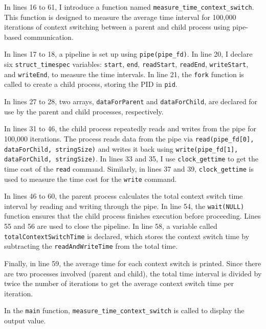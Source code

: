 \documentclass[10pt, answers]{exam}
\begin{document}
\begin{questions}
\begin{solution}
In lines 16 to 61, I introduce a function named \texttt{measure\_time\_context\_switch}. This function is designed to measure the average time interval for 100,000 iterations of context switching between a parent and child process using pipe-based communication.

In lines 17 to 18, a pipeline is set up using \texttt{pipe(pipe\_fd)}. In line 20, I declare six \texttt{struct\_timespec} variables: \texttt{start}, \texttt{end}, \texttt{readStart}, \texttt{readEnd}, \texttt{writeStart}, and \texttt{writeEnd}, to measure the time intervals. In line 21, the \texttt{fork\(\)} function is called to create a child process, storing the PID in \texttt{pid}.

In lines 27 to 28, two arrays, \texttt{dataForParent} and \texttt{dataForChild}, are declared for use by the parent and child processes, respectively.

In lines 31 to 46, the child process repeatedly reads and writes from the pipe for 100,000 iterations. The process reads data from the pipe via \texttt{read(pipe\_fd[0], dataForChild, stringSize)} and writes it back using \texttt{write(pipe\_fd[1], dataForChild, stringSize)}. In lines 33 and 35, I use \texttt{clock\_gettime} to get the time cost of the \texttt{read} command. Similarly, in lines 37 and 39, \texttt{clock\_gettime} is used to measure the time cost for the \texttt{write} command.

In lines 46 to 60, the parent process calculates the total context switch time interval by reading and writing through the pipe. In line 54, the \texttt{wait(NULL)} function ensures that the child process finishes execution before proceeding. Lines 55 and 56 are used to close the pipeline. In line 58, a variable called \texttt{totalContextSwitchTime} is declared, which stores the context switch time by subtracting the \texttt{readAndWriteTime} from the total time.

Finally, in line 59, the average time for each context switch is printed. Since there are two processes involved (parent and child), the total time interval is divided by twice the number of iterations to get the average context switch time per iteration.

In the \texttt{main} function, \texttt{measure\_time\_context\_switch} is called to display the output value.


\end{solution}

\end{questions}
\end{document}
